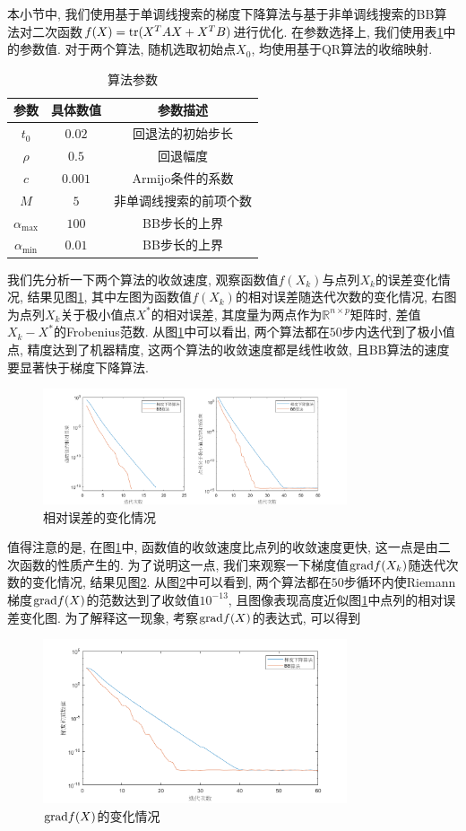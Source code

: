 \documentclass[UTF8]{ctexart}
\begin{document}
本小节中, 我们使用基于单调线搜索的梯度下降算法与基于非单调线搜索的BB算法对二次函数$f(X)=\textup{tr}(X^T AX+X^T B)$进行优化. 在参数选择上, 我们使用表\ref{tab1}中的参数值. 对于两个算法, 随机选取初始点$X_0$, 均使用基于QR算法的收缩映射. \par
\begin{table}[htbp]
    \caption{算法参数}\label{tab1}
    \centering
    \begin{tabular}{c|cc}
        \hline
        \hline
        参数 & 具体数值 & 参数描述\\
        \hline
        $t_0$ & $0.02$ & 回退法的初始步长\\
        $\rho$ & $0.5$ & 回退幅度\\
        $c$ & $0.001$ & Armijo条件的系数\\
        $M$ & $5$ & 非单调线搜索的前项个数\\
        $\alpha_{\max}$ & $100$ & BB步长的上界\\
        $\alpha_{\min}$ & $0.01$ & BB步长的上界\\
        \hline
        \hline
    \end{tabular}
\end{table}
我们先分析一下两个算法的收敛速度, 观察函数值$f(X_k)$与点列$X_k$的误差变化情况, 结果见图\ref{fig1}, 其中左图为函数值$f(X_k)$的相对误差随迭代次数的变化情况, 右图为点列$X_k$关于极小值点$X^*$的相对误差, 其度量为两点作为$\mathbb{R}^{n\times p}$矩阵时, 差值$X_k-X^*$的Frobenius范数. 从图\ref{fig1}中可以看出, 两个算法都在$50$步内迭代到了极小值点, 精度达到了机器精度, 这两个算法的收敛速度都是线性收敛, 且BB算法的速度要显著快于梯度下降算法. \par
\begin{figure}[htbp]
    \centering
    \includegraphics[width=0.8\textwidth]{Q2-figure/1.png}
    \caption{相对误差的变化情况}\label{fig1}
\end{figure}
值得注意的是, 在图\ref{fig1}中, 函数值的收敛速度比点列的收敛速度更快, 这一点是由二次函数的性质产生的. 为了说明这一点, 我们来观察一下梯度值$\textup{grad}f(X_k)$随迭代次数的变化情况, 结果见图\ref{fig2}. 从图\ref{fig2}中可以看到, 两个算法都在$50$步循环内使Riemann梯度$\textup{grad}f(X)$的范数达到了收敛值$10^{-13}$, 且图像表现高度近似图\ref{fig1}中点列的相对误差变化图. 为了解释这一现象, 考察$\textup{grad}f(X)$的表达式, 可以得到
\begin{figure}[htbp]
    \centering
    \includegraphics[width=0.8\textwidth]{Q2-figure/2.png}
    \caption{$\textup{grad}f(X)$的变化情况}\label{fig2}
\end{figure}
\end{document}
